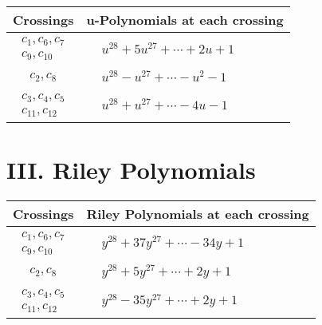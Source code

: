 \documentclass[1p]{elsarticle_modified}
\theoremstyle{definition}
\begin{document}
\begin{tabular}{m{50pt}|m{274pt}}
Crossings & \hspace{64pt}u-Polynomials at each crossing \\
\hline $$\begin{aligned}c_{1},c_{6},c_{7}\\c_{9},c_{10}\end{aligned}$$&$\begin{aligned}
&u^{28}+5 u^{27}+\cdots+2 u+1
\end{aligned}$\\
\hline $$\begin{aligned}c_{2},c_{8}\end{aligned}$$&$\begin{aligned}
&u^{28}- u^{27}+\cdots- u^2-1
\end{aligned}$\\
\hline $$\begin{aligned}c_{3},c_{4},c_{5}\\c_{11},c_{12}\end{aligned}$$&$\begin{aligned}
&u^{28}+u^{27}+\cdots-4 u-1
\end{aligned}$\\
\hline
\end{tabular}\newpage\renewcommand{\arraystretch}{1}
\centering \section*{ III. Riley Polynomials}
\begin{tabular}{m{50pt}|m{274pt}}
Crossings & \hspace{64pt}Riley Polynomials at each crossing \\
\hline $$\begin{aligned}c_{1},c_{6},c_{7}\\c_{9},c_{10}\end{aligned}$$&$\begin{aligned}
&y^{28}+37 y^{27}+\cdots-34 y+1
\end{aligned}$\\
\hline $$\begin{aligned}c_{2},c_{8}\end{aligned}$$&$\begin{aligned}
&y^{28}+5 y^{27}+\cdots+2 y+1
\end{aligned}$\\
\hline $$\begin{aligned}c_{3},c_{4},c_{5}\\c_{11},c_{12}\end{aligned}$$&$\begin{aligned}
&y^{28}-35 y^{27}+\cdots+2 y+1
\end{aligned}$\\
\hline
\end{tabular}
\vskip 2pc
\end{document}

